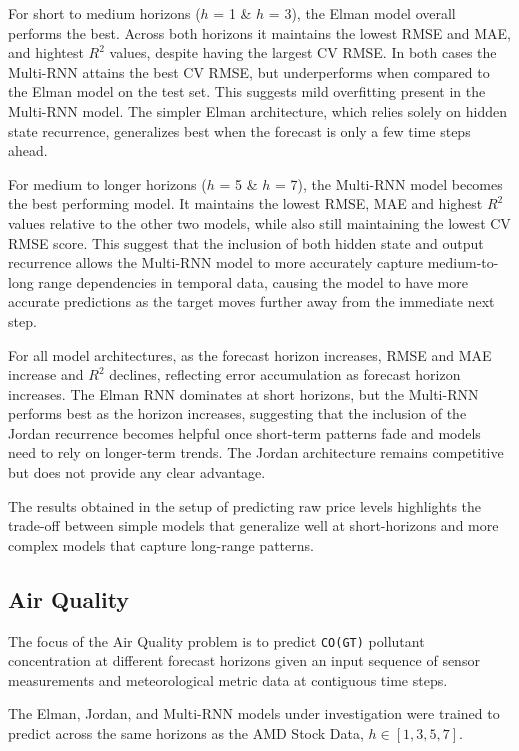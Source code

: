 \documentclass[conference]{IEEEtran}
\begin{document}
For short to medium horizons ($h$ = 1 \& $h$ = 3), the Elman model overall performs the best. Across both horizons it maintains the lowest RMSE and MAE, and hightest $R^2$ values, despite having the largest CV RMSE. In both cases the Multi-RNN attains the best CV RMSE, but underperforms when compared to the Elman model on the test set. This suggests mild overfitting present in the Multi-RNN model. The simpler Elman architecture, which relies solely on hidden state recurrence, generalizes best when the forecast is only a few time steps ahead.

For medium to longer horizons ($h$ = 5 \& $h$ = 7), the Multi-RNN model becomes the best performing model. It maintains the lowest RMSE, MAE and highest $R^2$ values relative to the other two models, while also still maintaining the lowest CV RMSE score. This suggest that the inclusion of both hidden state and output recurrence allows the Multi-RNN model to more accurately capture medium-to-long range dependencies in temporal data, causing the model to have more accurate predictions as the target moves further away from the immediate next step.

For all model architectures, as the forecast horizon increases, RMSE and MAE increase and $R^2$ declines, reflecting error accumulation as forecast horizon increases. The Elman RNN dominates at short horizons, but the Multi-RNN performs best as the horizon increases, suggesting that the inclusion of the Jordan recurrence becomes helpful once short-term patterns fade and models need to rely on longer-term trends. The Jordan architecture remains competitive but does not provide any clear advantage.

The results obtained in the setup of predicting raw price levels highlights the trade-off between simple models that generalize well at short-horizons and more complex models that capture long-range patterns.  

\subsection{\textbf{Air Quality}}
The focus of the Air Quality problem is to predict \texttt{CO(GT)} pollutant concentration at different forecast horizons given an input sequence of sensor measurements and meteorological metric data at contiguous time steps.

The Elman, Jordan, and Multi-RNN models under investigation were trained to predict across the same horizons as the AMD Stock Data, $h \in [1,3,5,7]$.
\end{document}
